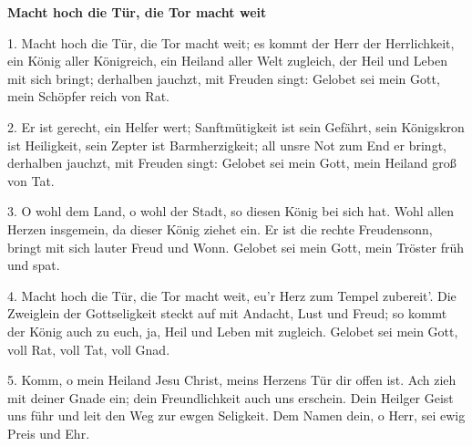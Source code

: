 \documentclass[10pt]{article}
\begin{document}
{\Large
\begin{guitar}
    \textbf{Macht hoch die Tür, die Tor macht weit}


    1. Macht hoch die Tür, die Tor macht weit;
    es kommt der Herr der Herrlichkeit,
    ein König aller Königreich,
    ein Heiland aller Welt zugleich,
    der Heil und Leben mit sich bringt;
    derhalben jauchzt, mit Freuden singt:
    Gelobet sei mein Gott,
    mein Schöpfer reich von Rat.


    2. Er ist gerecht, ein Helfer wert;
    Sanftmütigkeit ist sein Gefährt,
    sein Königskron ist Heiligkeit,
    sein Zepter ist Barmherzigkeit;
    all unsre Not zum End er bringt,
    derhalben jauchzt, mit Freuden singt:
    Gelobet sei mein Gott,
    mein Heiland groß von Tat.


    3. O wohl dem Land, o wohl der Stadt,
    so diesen König bei sich hat.
    Wohl allen Herzen insgemein,
    da dieser König ziehet ein.
    Er ist die rechte Freudensonn,
    bringt mit sich lauter Freud und Wonn.
    Gelobet sei mein Gott,
    mein Tröster früh und spat.


    4. Macht hoch die Tür, die Tor macht weit,
    eu’r Herz zum Tempel zubereit’.
    Die Zweiglein der Gottseligkeit
    steckt auf mit Andacht, Lust und Freud;
    so kommt der König auch zu euch,
    ja, Heil und Leben mit zugleich.
    Gelobet sei mein Gott,
    voll Rat, voll Tat, voll Gnad.


    5. Komm, o mein Heiland Jesu Christ,
    meins Herzens Tür dir offen ist.
    Ach zieh mit deiner Gnade ein;
    dein Freundlichkeit auch uns erschein.
    Dein Heilger Geist uns führ und leit
    den Weg zur ewgen Seligkeit.
    Dem Namen dein, o Herr,
    sei ewig Preis und Ehr.

\end{guitar}
}
\end{document}
